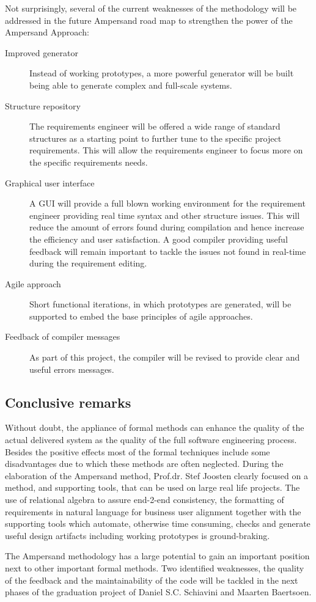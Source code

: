 Not surprisingly, several of the current weaknesses of the methodology will be addressed in the future Ampersand road map to strengthen the power of the Ampersand Approach:
\begin{description}
	\item[Improved generator] Instead of working prototypes, a more powerful generator will be built being able to generate complex and full-scale systems.
	\item[Structure repository] The requirements engineer will be offered a wide range of standard structures as a starting point to further tune to the specific project requirements.
	This will allow the requirements engineer to focus more on the specific requirements needs.
	\item[Graphical user interface] A GUI will provide a full blown working environment for the requirement engineer providing real time syntax and other structure issues. 
	This will reduce the amount of errors found during compilation and hence increase the efficiency and user satisfaction. 
	A good compiler providing useful feedback will remain important to tackle the issues not found in real-time during the requirement editing.
	\item[Agile approach] Short functional iterations, in which prototypes are generated, will be supported to embed the base principles of agile approaches.
	\item[Feedback of compiler messages] As part of this project, the compiler will be revised to provide clear and useful errors messages.
\end{description}

\subsection{Conclusive remarks}
Without doubt, the appliance of formal methods can enhance the quality of the actual delivered system as the quality of the full software engineering process. 
Besides the positive effects most of the formal techniques include some disadvantages due to which these methods are often neglected. 
During the elaboration of the Ampersand method, Prof.dr. Stef Joosten clearly focused on a method, and supporting tools, that can be used on large real life projects. 
The use of relational algebra to assure end-2-end consistency, the formatting of requirements in natural language for business user alignment together with the supporting tools which automate, otherwise time consuming, checks and  generate useful design artifacts including working prototypes is ground-braking.

The Ampersand methodology has a large potential to gain an important position next to other important formal methods. 
Two identified weaknesses, the quality of the feedback and the maintainability of the code will be tackled in the next phases of the graduation project of  Daniel S.C. Schiavini and Maarten Baertsoen.






